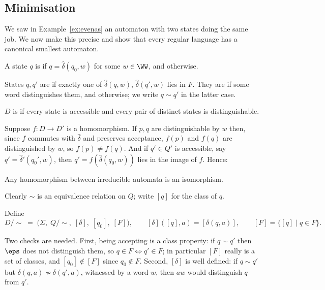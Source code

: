 \subsection{Minimisation}\label{sec:minimisation}

We saw in Example~\ref{ex:evenas} an automaton with two states doing the same job. We now make this precise and show that every regular language has a canonical smallest automaton.

\begin{definition}
	A state $q$ is  if $q = \hat\delta(q_0, w)$ for some $w \in \WW$, and  otherwise.

	States $q, q'$ are  if exactly one of $\hat\delta(q,w)$, $\hat\delta(q',w)$ lies in $F$. They are  if some word distinguishes them, and  otherwise; we write $q \sim q'$ in the latter case.

	$D$ is  if every state is accessible and every pair of distinct states is distinguishable.
\end{definition}

Suppose $f \colon D \to D'$ is a homomorphism. If $p,q$ are distinguishable by $w$ then, since $f$ commutes with $\hat\delta$ and preserves acceptance, $f(p)$ and $f(q)$ are distinguished by $w$, so $f(p) \neq f(q)$. And if $q' \in Q'$ is accessible, say $q' = \hat\delta'(q_0',w)$, then $q' = f(\hat\delta(q_0,w))$ lies in the image of $f$. Hence:

\begin{proposition}\label{prop:irreduciblehom}
	Any homomorphism between irreducible automata is an isomorphism.
\end{proposition}

Clearly $\sim$ is an equivalence relation on $Q$; write $[q]$ for the class of $q$.

\begin{definition}
	Define
	$$D/{\sim} \;=\; \big(\Sigma,\; Q/{\sim},\; [\delta],\; [q_0],\; [F]\big), \qquad [\delta]([q],a) = [\delta(q,a)], \qquad [F] = \{[q] \mid q \in F\}.$$
\end{definition}

Two checks are needed. First, being accepting is a class property: if $q \sim q'$ then $\eps$ does not distinguish them, so $q \in F \iff q' \in F$; in particular $[F]$ really is a set of classes, and $[q_0] \notin [F]$ since $q_0 \notin F$. Second, $[\delta]$ is well defined: if $q \sim q'$ but $\delta(q,a) \not\sim \delta(q',a)$, witnessed by a word $w$, then $aw$ would distinguish $q$ from $q'$.

